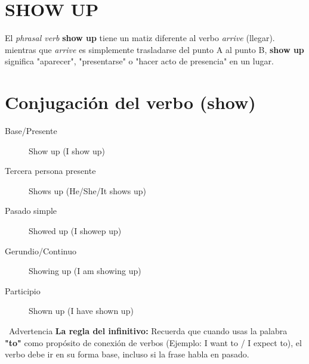 \documentclass[
10pt, %
a4paper, %
oneside, %
headinclude,footinclude, %
BCOR5mm, %
]{scrartcl}
\begin{document}



\newpage %


\section{SHOW UP}
El \textit{phrasal verb} \textbf{show up} tiene un matiz diferente al verbo \textit{arrive} (llegar). mientras que \textit{arrive} es simplemente trasladarse del punto A al punto B, \textbf{show up} significa "aparecer", "presentarse" o "hacer acto de presencia" en un lugar.

\section{Conjugación del verbo (show)}

\begin{description}
	\item[Base/Presente] Show up (I show up)
	\item[Tercera persona presente] Shows up (He/She/It shows up)
	\item[Pasado simple] Showed up (I showep up)
	\item[Gerundio/Continuo] Showing up (I am showing up)
	\item[Participio] Shown up (I have shown up)
\end{description}

\begin{WarningBox}{ \, Advertencia} 
	\textbf{La regla del infinitivo:} Recuerda que cuando usas la palabra \textbf{"to"} como propósito de conexión de verbos (Ejemplo: I want to / I expect to), el verbo debe ir en su forma base, incluso si la frase habla en pasado. 
\end{WarningBox}
\end{document}
